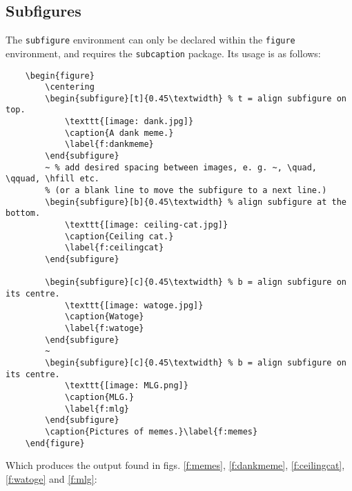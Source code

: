 \subsection{Subfigures}
%
The \verb|subfigure| environment can only be declared within the
\verb|figure| environment, and requires the \verb|subcaption| package.
Its usage is as follows:
\begin{verbatim}
	\begin{figure}
	    \centering
	    \begin{subfigure}[t]{0.45\textwidth} % t = align subfigure on top.
	        \texttt{[image: dank.jpg]}
	        \caption{A dank meme.}
	        \label{f:dankmeme}
	    \end{subfigure}
	    ~ % add desired spacing between images, e. g. ~, \quad, \qquad, \hfill etc.
	    % (or a blank line to move the subfigure to a next line.)
	    \begin{subfigure}[b]{0.45\textwidth} % align subfigure at the bottom.
	        \texttt{[image: ceiling-cat.jpg]}
	        \caption{Ceiling cat.}
	        \label{f:ceilingcat}
	    \end{subfigure}

	    \begin{subfigure}[c]{0.45\textwidth} % b = align subfigure on its centre.
	        \texttt{[image: watoge.jpg]}
	        \caption{Watoge}
	        \label{f:watoge}
	    \end{subfigure}
	    ~
	    \begin{subfigure}[c]{0.45\textwidth} % b = align subfigure on its centre.
	        \texttt{[image: MLG.png]}
	        \caption{MLG.}
	        \label{f:mlg}
	    \end{subfigure}
	    \caption{Pictures of memes.}\label{f:memes}
	\end{figure}
\end{verbatim}
Which produces the output found in figs. \ref{f:memes},
\ref{f:dankmeme}, \ref{f:ceilingcat}, \ref{f:watoge} and \ref{f:mlg}:
